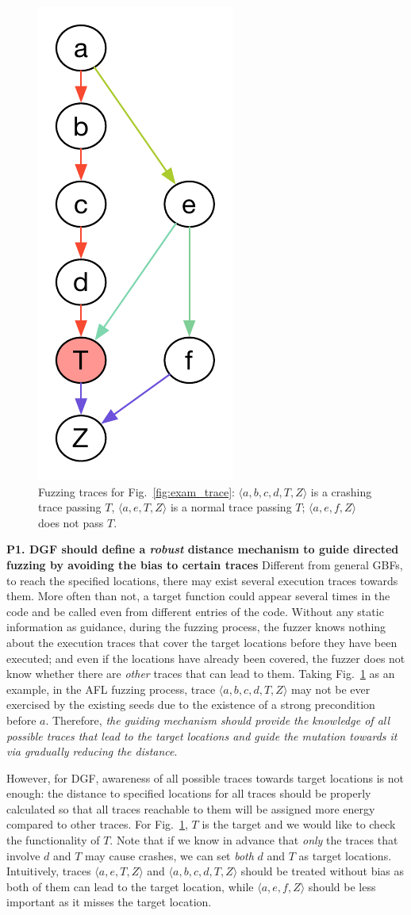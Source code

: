 \begin{figure}[t]
	\centering
	\includegraphics[width=0.16\columnwidth]{res/dfot/eg_callchain.pdf}
	\vspace{-5pt}
	\caption{Fuzzing traces for Fig.~\ref{fig:exam_trace}: $\langle a, b, c, d, T, Z\rangle $ is a crashing trace passing $T$,  $\langle a, e, T, Z\rangle$ is a normal trace passing $T$; $\langle a, e, f , Z\rangle$ does not pass $T$.}
	\label{fig:call_chain}
\end{figure}

\textbf{P1. DGF should define a \emph{robust} distance mechanism to guide directed fuzzing by avoiding the bias to certain traces}  \label{subsec:p1}
Different from general GBFs, to reach the specified locations, there may exist several execution traces towards them. More often than not, a target function could appear several times in the code and be called even from different entries of the code. Without any static information as guidance, during the fuzzing process, the fuzzer knows nothing about the execution traces that cover the target locations before they have been executed; and even if the locations have already been covered, the fuzzer does not know whether there are \emph{other} traces that can lead to them.  
Taking Fig.~\ref{fig:call_chain} as an example, in the AFL fuzzing process, trace $\langle a, b, c, d, T, Z\rangle$  may not be ever exercised by the existing seeds due to the existence of a strong precondition before $a$. Therefore, \emph{the guiding mechanism should provide the knowledge of all possible traces that lead to the target locations and guide the mutation towards it via gradually reducing the distance}. 

However, for DGF, awareness of all possible traces towards target locations is not enough: the distance to specified locations for all traces should be properly calculated so that all traces reachable to them will be assigned more energy compared to other traces. For Fig.~\ref{fig:call_chain}, $T$ is the target and we would like to check the functionality of $T$. Note that if we know in advance that \emph{only} the traces that involve $d$ and $T$ may cause crashes, we can set \emph{both} $d$ and $T$ as target locations. Intuitively, traces $ \langle a, e, T, Z\rangle$ and $\langle a, b, c, d, T, Z\rangle$ should be treated without bias as both of them can lead to the target location, while $ \langle a, e, f , Z\rangle$ should be less important as it misses the target location. 



